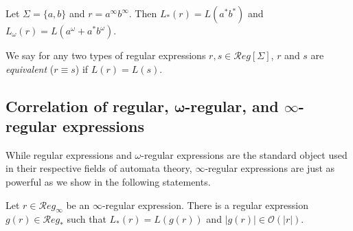 \begin{exmp}
	Let $\Sigma = \{a, b\}$ and $r = a^\infty b^\infty$.
	Then $L_*(r) = L(a^* b^*)$ and $L_\omega(r) = L(a^\omega + a^* b^\omega)$.
\end{exmp}

\begin{defn}
	We say for any two types of regular expressions $r, s \in \mathcal{R}eg[\Sigma]$, $r$ and $s$ are \emph{equivalent} ($r \equiv s$) if $L(r) = L(s)$.
\end{defn}

\vspace{5pt}


\subsection{Correlation of regular, $\boldsymbol{\omega}$-regular, and $\boldsymbol{\infty}$-regular expressions}
While regular expressions and $\omega$-regular expressions are the standard object used in their respective fields of automata theory, $\infty$-regular expressions are just as powerful as we show in the following statements.

\begin{lem}
	Let $r \in \mathcal{R}eg_\infty$ be an $\infty$-regular expression. There is a regular expression $g(r) \in \mathcal{R}eg_*$ such that $L_*(r) = L(g(r))$ and $|g(r)| \in \mathcal{O}(|r|)$.
	\label{lem:infty_regexp_to_normal_regexp}
\end{lem}

